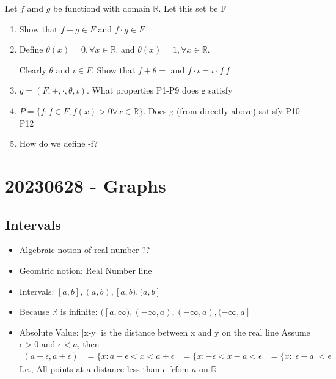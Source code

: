 \documentclass{report}
\begin{document}
    \ex{} {
      Let $f$ amd $g$ be functiond with domain $\mathbb{R}$.  Let
      this set be F
      \begin{enumerate}
        \item Show that $f+g \in F$ and $f \cdot g \in F$
        \item Define $\theta(x) = 0, \forall x \in \mathbb{R}$.  
          and  $\theta(x) = 1, \forall x \in \mathbb{R}$.  


          Clearly $\theta$ and $\iota \in F$.  Show that $f + \theta = $
          and $f \cdot \iota = \iota \cdot f \ f$

        \item $g = (F, +, \cdot, \theta, \iota)$.  What properties P1-P9
          does g satisfy
        \item $P = \{f: f \in F, f(x)>0 \forall  x \in \mathbb{R}\}$.
          Does g (from directly above) satisfy P10-P12
        \item How do we define -f?
      \end{enumerate}
    }

\section*{20230628 - Graphs}
  \subsection{Intervals}%
  \begin{itemize}
    \item Algebraic notion of real number ??
    \item Geomtric notion: Real Number line
    \item Intervals: $[a,b], (a,b), [a,b), (a,b]$
    \item Because $\mathbb{R}$ is infinite: $([a,\infty), (- \infty,a),
      (-\infty, a), (- \infty, a]$
    \item Absolute Value: |x-y| is the distance between x and y on the
      real line
    Assume $\epsilon > 0 \text{ and } \epsilon < a$, then
    \begin{align}
      (a - \epsilon, a + \epsilon) &= \{ x: a - \epsilon < x < a + \epsilon 
      &= \{ x: - \epsilon < x - a < \epsilon 
      &= \{ x: |\epsilon -a | < \epsilon 
    \end{align}
      I.e., All points at a distance less than $\epsilon$ frfom $a$ on
      $\mathbb{R}$
  \end{itemize}
\end{document}
